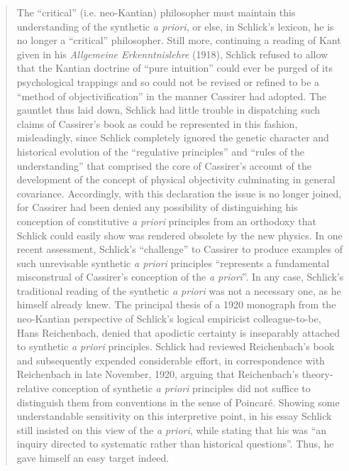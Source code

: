 \begin{quote}
    The ``critical'' (i.e. neo-Kantian) philosopher must maintain this understanding of the synthetic \emph{a priori}, or else, in Schlick's lexicon, he is no longer a ``critical'' philosopher.  Still more, continuing a reading of Kant given in his \emph{Allgemeine Erkenntnislehre} (1918), Schlick refused to allow that the Kantian doctrine of ``pure intuition'' could ever be purged of its psychological trappings and so could not be revised or refined to be a ``method of objectivification'' in the manner Cassirer had adopted.  The gauntlet thus laid down, Schlick had little trouble in dispatching such claims of Cassirer's book as could be represented in this fashion, misleadingly, since Schlick completely ignored the genetic character and historical evolution of the ``regulative principles'' and ``rules of the understanding'' that comprised the core of Cassirer's account of the development of the concept of physical objectivity culminating in general covariance.  Accordingly, with this declaration the issue is no longer joined, for Cassirer had been denied any possibility of distinguishing his conception of constitutive \emph{a priori} principles from an orthodoxy that Schlick could easily show was rendered obsolete by the new physics.  In one recent assessment, Schlick's ``challenge'' to Cassirer to produce examples of such unrevisable synthetic \emph{a priori} principles ``represents a fundamental misconstrual of Cassirer's conception of the \emph{a priori}''.  In any case, Schlick's traditional reading of the synthetic \emph{a priori} was not a necessary one, as he himself already knew.  The principal thesis of a 1920 monograph from the neo-Kantian perspective of Schlick's logical empiricist colleague-to-be, Hans Reichenbach, denied that apodictic certainty is inseparably attached to synthetic \emph{a priori} principles.  Schlick had reviewed Reichenbach's book and subsequently expended considerable effort, in correspondence with Reichenbach in late November, 1920, arguing that Reichenbach's theory-relative conception of synthetic \emph{a priori} principles did not suffice to distinguish them from conventions in the sense of Poincar\'e.  Showing some understandable sensitivity on this interpretive point, in his essay Schlick still insisted on this view of the \emph{a priori}, while stating that his was ``an inquiry directed to systematic rather than historical questions''.  Thus, he gave himself an easy target indeed.
    
    \citep[p. 50-51]{Ryckman2005}
\end{quote}

